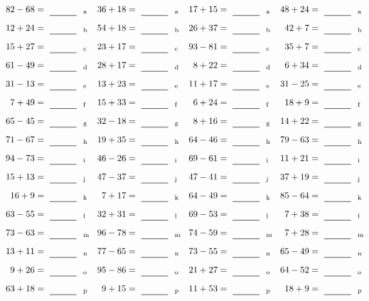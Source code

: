 \documentclass
[
  draft    = true,
  fontsize = 11pt,
  parskip  = half-
]
{scrartcl}
\begin{document}
\clearpage
\begin{align*}
    \pline{82-68}&=\rline{a}
  & \pline{36+18}&=\rline{a}
  & \pline{17+15}&=\rline{a}
  & \pline{48+24}&=\rline{a} \\[1ex]
    \pline{12+24}&=\rline{b}
  & \pline{54+18}&=\rline{b}
  & \pline{26+37}&=\rline{b}
  & \pline{42+7}&=\rline{b} \\[1ex]
    \pline{15+27}&=\rline{c}
  & \pline{23+17}&=\rline{c}
  & \pline{93-81}&=\rline{c}
  & \pline{35+7}&=\rline{c} \\[1ex]
    \pline{61-49}&=\rline{d}
  & \pline{28+17}&=\rline{d}
  & \pline{8+22}&=\rline{d}
  & \pline{6+34}&=\rline{d} \\[1ex]
    \pline{31-13}&=\rline{e}
  & \pline{13+23}&=\rline{e}
  & \pline{11+17}&=\rline{e}
  & \pline{31-25}&=\rline{e} \\[1ex]
    \pline{7+49}&=\rline{f}
  & \pline{15+33}&=\rline{f}
  & \pline{6+24}&=\rline{f}
  & \pline{18+9}&=\rline{f} \\[1ex]
    \pline{65-45}&=\rline{g}
  & \pline{32-18}&=\rline{g}
  & \pline{8+16}&=\rline{g}
  & \pline{14+22}&=\rline{g} \\[1ex]
    \pline{71-67}&=\rline{h}
  & \pline{19+35}&=\rline{h}
  & \pline{64-46}&=\rline{h}
  & \pline{79-63}&=\rline{h} \\[1ex]
    \pline{94-73}&=\rline{i}
  & \pline{46-26}&=\rline{i}
  & \pline{69-61}&=\rline{i}
  & \pline{11+21}&=\rline{i} \\[1ex]
    \pline{15+13}&=\rline{j}
  & \pline{47-37}&=\rline{j}
  & \pline{47-41}&=\rline{j}
  & \pline{37+19}&=\rline{j} \\[1ex]
    \pline{16+9}&=\rline{k}
  & \pline{7+17}&=\rline{k}
  & \pline{64-49}&=\rline{k}
  & \pline{85-64}&=\rline{k} \\[1ex]
    \pline{63-55}&=\rline{l}
  & \pline{32+31}&=\rline{l}
  & \pline{69-53}&=\rline{l}
  & \pline{7+38}&=\rline{l} \\[1ex]
    \pline{73-63}&=\rline{m}
  & \pline{96-78}&=\rline{m}
  & \pline{74-59}&=\rline{m}
  & \pline{7+28}&=\rline{m} \\[1ex]
    \pline{13+11}&=\rline{n}
  & \pline{77-65}&=\rline{n}
  & \pline{73-55}&=\rline{n}
  & \pline{65-49}&=\rline{n} \\[1ex]
    \pline{9+26}&=\rline{o}
  & \pline{95-86}&=\rline{o}
  & \pline{21+27}&=\rline{o}
  & \pline{64-52}&=\rline{o} \\[1ex]
    \pline{63+18}&=\rline{p}
  & \pline{9+15}&=\rline{p}
  & \pline{11+53}&=\rline{p}
  & \pline{18+9}&=\rline{p}
\end{align*}
\end{document}
